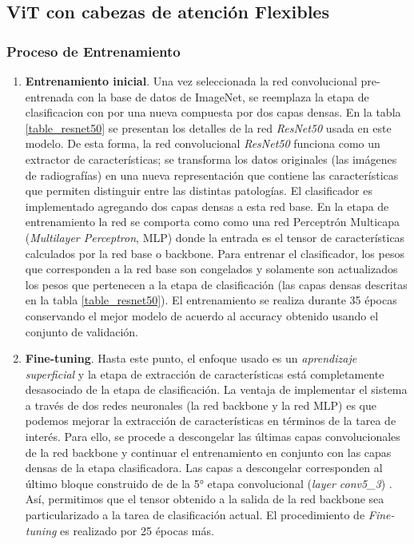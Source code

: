 {\subsection{ViT con cabezas de atención Flexibles}


\subsubsection{Proceso de Entrenamiento}
\label{ss:archiecture}

\begin{enumerate}
    \item \textbf{Entrenamiento inicial}. Una vez seleccionada la red convolucional pre-entrenada
          con la base de datos de ImageNet, se reemplaza la etapa de clasificacion con por una nueva
          compuesta por dos capas densas. En la tabla \ref{table_resnet50} se presentan los detalles
          de la red \textit{ResNet50} usada en este modelo. De esta forma, la red convolucional
          \textit{ResNet50} funciona como un extractor de características; se transforma los datos
          originales (las imágenes de radiografías) en una nueva representación que contiene las
          características que permiten distinguir entre las distintas patologías. El clasificador es
          implementado agregando dos capas densas a esta red base. En la etapa de entrenamiento la
          red se comporta como como una red Perceptrón Multicapa (\textit{Multilayer Perceptron},
          MLP) donde la entrada es el tensor de características calculados por la red base o
          backbone. Para entrenar el clasificador, los pesos que corresponden a la red base son
          congelados y solamente son actualizados los pesos que pertenecen a la etapa de
          clasificación (las capas densas descritas en la tabla \ref{table_resnet50}). El
          entrenamiento se realiza durante 35 épocas conservando el mejor modelo de acuerdo al
          accuracy obtenido usando el conjunto de validación.

    \item \textbf{Fine-tuning}. Hasta este punto, el enfoque usado es un \textit{aprendizaje superficial}
          y la etapa de extracción de características está completamente desasociado de la etapa de
          clasificación. La ventaja de implementar el sistema a través de dos redes neuronales (la
          red backbone y la red MLP) es que podemos mejorar la extracción de características en
          términos de la tarea de interés. Para ello, se procede a descongelar las últimas capas
          convolucionales de la red backbone y continuar el entrenamiento en conjunto con las capas
          densas de la etapa clasificadora. Las capas a descongelar corresponden al último bloque
          construido de de la 5° etapa convolucional (\textit{layer conv5\_3}) \cite{he2016deep}.
          Así, permitimos que el tensor obtenido a la salida de la red backbone sea particularizado
          a la tarea de clasificación actual. El procedimiento de \textit{Fine-tuning} es realizado
          por 25 épocas más.


\end{enumerate}}
